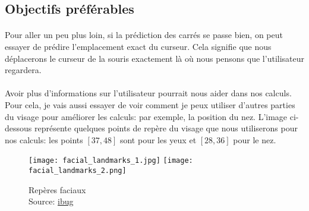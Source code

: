 \subsection{Objectifs préférables}
\paragraph{}
Pour aller un peu plus loin, si la prédiction des carrés se passe bien, on peut essayer de prédire l'emplacement exact du curseur.
Cela signifie que nous déplacerons le curseur de la souris exactement là où nous pensons que l'utilisateur regardera.

\paragraph{}
Avoir plus d'informations sur l'utilisateur pourrait nous aider dans nos calculs.
Pour cela, je vais aussi essayer de voir comment je peux utiliser d'autres parties du visage pour améliorer les calculs: par exemple, la position du nez.
L'image ci-dessous représente quelques points de repère du visage que nous utiliserons pour nos calculs: les points $[37, 48]$ sont pour les yeux et $[28, 36]$ pour le nez.
\begin{figure}[H]
    \centering
    \texttt{[image: facial\_landmarks\_1.jpg]}
    \texttt{[image: facial\_landmarks\_2.png]}
    \caption{Repères faciaux\\Source: \href{https://ibug.doc.ic.ac.uk/resources/300-W/}{ibug}}
\end{figure}